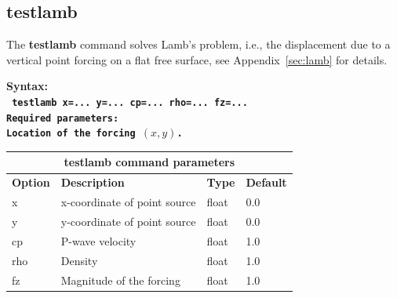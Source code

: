 \documentclass[11pt]{report}
\begin{document}
\subsection{testlamb}
\label{keyword:testlamb}
The {\bf testlamb} command solves Lamb's problem, i.e., the displacement due to a vertical point
forcing on a flat free surface, see Appendix~\ref{sec:lamb} for details. 
\begin{flushleft}
\bf
Syntax:\\
\tt
testlamb x=... y=... cp=... rho=... fz=...
\\
\bf Required parameters:\\
\rm Location of the forcing $(x, y)$.
\end{flushleft}
%
\begin{center}
\begin{tabular}{|l|p{8cm}|l|l|} \hline
\multicolumn{4}{|c|}{\bf testlamb command  parameters}\\ \hline
\bf{Option} & \bf{Description} & \bf{Type} & \bf{Default} \\ \hline \hline
x    & x-coordinate of point source & float & 0.0 \\ \hline
y    & y-coordinate of point source & float & 0.0 \\ \hline
cp   & P-wave velocity              & float & 1.0 \\ \hline
rho  & Density                      & float & 1.0 \\ \hline
fz   & Magnitude of the forcing     & float & 1.0 \\ \hline
\end{tabular}
\end{center}

\end{document}
